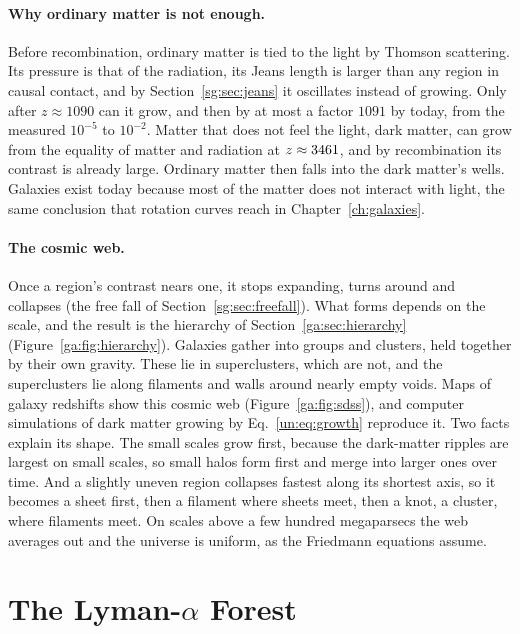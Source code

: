 \paragraph{Why ordinary matter is not enough.} Before recombination, ordinary matter is tied to the light by Thomson scattering. Its pressure is that of the radiation, its Jeans length is larger than any region in causal contact, and by Section~\ref{sg:sec:jeans} it oscillates instead of growing. Only after $z\approx1090$ can it grow, and then by at most a factor $1091$ by today, from the measured $10^{-5}$ to $10^{-2}$. Matter that does not feel the light, dark matter, can grow from the equality of matter and radiation at $z\approx3461$, and by recombination its contrast is already large. Ordinary matter then falls into the dark matter's wells. Galaxies exist today because most of the matter does not interact with light, the same conclusion that rotation curves reach in Chapter~\ref{ch:galaxies}.

\paragraph{The cosmic web.} Once a region's contrast nears one, it stops expanding, turns around and collapses (the free fall of Section~\ref{sg:sec:freefall}). What forms depends on the scale, and the result is the hierarchy of Section~\ref{ga:sec:hierarchy} (Figure~\ref{ga:fig:hierarchy}). Galaxies gather into groups and clusters, held together by their own gravity. These lie in superclusters, which are not, and the superclusters lie along filaments and walls around nearly empty voids. Maps of galaxy redshifts show this cosmic web (Figure~\ref{ga:fig:sdss}), and computer simulations of dark matter growing by Eq.~\eqref{un:eq:growth} reproduce it. Two facts explain its shape. The small scales grow first, because the dark-matter ripples are largest on small scales, so small halos form first and merge into larger ones over time. And a slightly uneven region collapses fastest along its shortest axis, so it becomes a sheet first, then a filament where sheets meet, then a knot, a cluster, where filaments meet. On scales above a few hundred megaparsecs the web averages out and the universe is uniform, as the Friedmann equations assume.

\section{The Lyman-\texorpdfstring{$\alpha$}{alpha} Forest}
\label{un:sec:forest}

